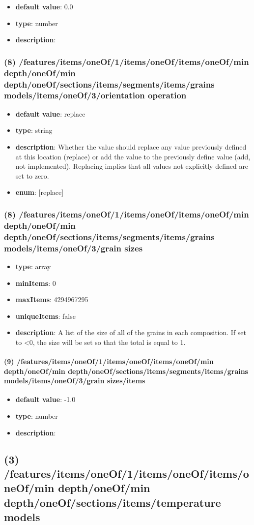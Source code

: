 \begin{itemize}[leftmargin=10em]\item {\bf default value}: 0.0
\item {\bf type}: number
\item {\bf description}: 
\end{itemize}\subsubsection{(8) /features/items/oneOf/1/items/oneOf/items/oneOf/min depth/oneOf/min depth/oneOf/sections/items/segments/items/grains models/items/oneOf/3/orientation operation}
\begin{itemize}[leftmargin=8em]\item {\bf default value}: replace
\item {\bf type}: string
\item {\bf description}: Whether the value should replace any value previously defined at this location (replace) or add the value to the previously define value (add, not implemented). Replacing implies that all values not explicitly defined are set to zero.
\item {\bf enum}: [replace]\end{itemize}\subsubsection{(8) /features/items/oneOf/1/items/oneOf/items/oneOf/min depth/oneOf/min depth/oneOf/sections/items/segments/items/grains models/items/oneOf/3/grain sizes}
\begin{itemize}[leftmargin=8em]\item {\bf type}: array
\item {\bf minItems}: 0
\item {\bf maxItems}: 4294967295
\item {\bf uniqueItems}: false
\item {\bf description}: A list of the size of all of the grains in each composition. If set to <0, the size will be set so that the total is equal to 1.
\end{itemize}\paragraph{(9) /features/items/oneOf/1/items/oneOf/items/oneOf/min depth/oneOf/min depth/oneOf/sections/items/segments/items/grains models/items/oneOf/3/grain sizes/items}
\begin{itemize}[leftmargin=9em]\item {\bf default value}: -1.0
\item {\bf type}: number
\item {\bf description}: 
\end{itemize}\subsection{(3) /features/items/oneOf/1/items/oneOf/items/oneOf/min depth/oneOf/min depth/oneOf/sections/items/temperature models}
